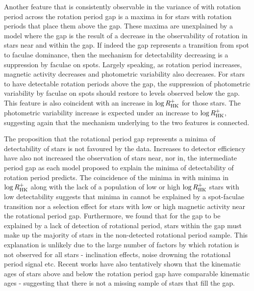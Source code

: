 Another feature that is consistently observable in the variance of \rper{} with rotation period across the rotation period gap is a maxima in \rper{} for stars with rotation periods that place them above the gap.
These maxima are unexplained by a model where the gap is the result of a decrease in the observability of rotation in stars near and within the gap.
If indeed the gap represents a transition from spot to faculae dominance, then the mechanism for detectability decreasing is a suppression \rper{} by faculae on spots.
Largely speaking, as rotation period increases, magnetic activity decreases and photometric variability also decreases.
For stars to have detectable rotation periods above the gap, the suppression of photometric variability by faculae on spots should restore \rper{} to levels observed below the gap.
This feature is also coincident with an increase in $\log R^{+}_{\rm{HK}}$ for those stars.
The photometric variability increase is expected under an increase to  $\log R^{+}_{\rm{HK}}$, suggesting again that the mechanism underlying to the two features is connected.

The proposition that the rotational period gap represents a minima of detectability of stars is not favoured by the data.
Increases to detector efficiency have also not increased the observation of stars near, nor in, the intermediate period gap as each model proposed to explain the minima of detectability of rotation period predicts.
The coincidence of the minima in \rper{} with minima in $\log R^{+}_{\rm{HK}}$ along with the lack of a population of low or high $\log R^{+}_{\rm{HK}}$ stars with low detectability suggests that minima in \rper{} cannot be explained by a spot-faculae transition nor a selection effect for stars with low or high magnetic activity near the rotational period gap.
Furthermore, we found that for the gap to be explained by a lack of detection of rotational period, stars within the gap must make up the majority of stars in the \kepler{} non-detected rotational period sample.
This explanation is unlikely due to the large number of factors by which rotation is not observed for all stars - inclination effects, noise drowning the rotational period signal etc.
Recent works have also tentatively shown that the kinematic ages of stars above and below the rotation period gap have comparable kinematic ages \citep{lu_bridging_2022} - suggesting that there is not a missing sample of stars that fill the gap.

